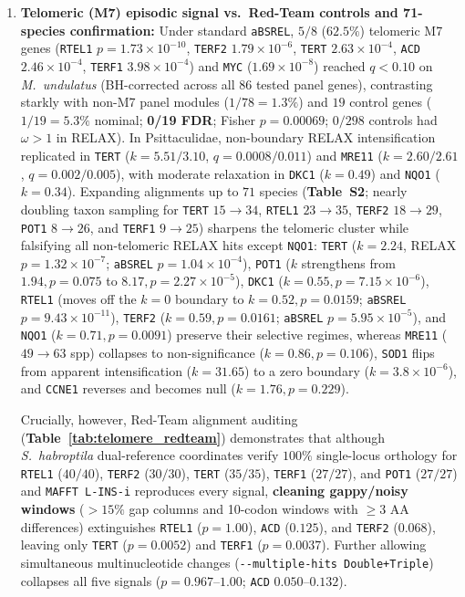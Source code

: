 \documentclass[10pt,a4paper,twocolumn]{article}
\begin{document}
\begin{enumerate}
    \item \textbf{Telomeric (M7) episodic signal vs.\ Red-Team controls and 71-species confirmation:} Under standard \texttt{aBSREL}, $5/8$ ($62.5\%$) telomeric M7 genes (\texttt{RTEL1} $p = 1.73\times 10^{-10}$, \texttt{TERF2} $1.79\times 10^{-6}$, \texttt{TERT} $2.63\times 10^{-4}$, \texttt{ACD} $2.46\times 10^{-4}$, \texttt{TERF1} $3.98\times 10^{-4}$) and \texttt{MYC} ($1.69\times 10^{-8}$) reached $q < 0.10$ on \textit{M.\ undulatus} (BH-corrected across all $86$ tested panel genes), contrasting starkly with non-M7 panel modules ($1/78 = 1.3\%$) and $19$ control genes ($1/19 = 5.3\%$ nominal; \textbf{0/19 FDR}; Fisher $p = 0.00069$; $0/298$ controls had $\omega > 1$ in RELAX). In Psittaculidae, non-boundary RELAX intensification replicated in \texttt{TERT} ($k = 5.51/3.10$, $q = 0.0008/0.011$) and \texttt{MRE11} ($k = 2.60/2.61$, $q = 0.002/0.005$), with moderate relaxation in \texttt{DKC1} ($k = 0.49$) and \texttt{NQO1} ($k = 0.34$). Expanding alignments up to $71$ species (\textbf{Table~S2}; nearly doubling taxon sampling for \texttt{TERT} $15\to 34$, \texttt{RTEL1} $23\to 35$, \texttt{TERF2} $18\to 29$, \texttt{POT1} $8\to 26$, and \texttt{TERF1} $9\to 25$) sharpens the telomeric cluster while falsifying all non-telomeric RELAX hits except \texttt{NQO1}: \texttt{TERT} ($k = 2.24$, RELAX $p = 1.32\times 10^{-7}$; \texttt{aBSREL} $p = 1.04\times 10^{-4}$), \texttt{POT1} ($k$ strengthens from $1.94, p = 0.075$ to $8.17, p = 2.27\times 10^{-5}$), \texttt{DKC1} ($k = 0.55, p = 7.15\times 10^{-6}$), \texttt{RTEL1} (moves off the $k=0$ boundary to $k = 0.52, p = 0.0159$; \texttt{aBSREL} $p = 9.43\times 10^{-11}$), \texttt{TERF2} ($k = 0.59, p = 0.0161$; \texttt{aBSREL} $p = 5.95\times 10^{-5}$), and \texttt{NQO1} ($k = 0.71, p = 0.0091$) preserve their selective regimes, whereas \texttt{MRE11} ($49\to 63$ spp) collapses to non-significance ($k = 0.86, p = 0.106$), \texttt{SOD1} flips from apparent intensification ($k = 31.65$) to a zero boundary ($k = 3.8\times 10^{-6}$), and \texttt{CCNE1} reverses and becomes null ($k = 1.76, p = 0.229$).

    Crucially, however, Red-Team alignment auditing (\textbf{Table~\ref{tab:telomere_redteam}}) demonstrates that although \textit{S.\ habroptila} dual-reference coordinates verify $100\%$ single-locus orthology for \texttt{RTEL1} ($40/40$), \texttt{TERF2} ($30/30$), \texttt{TERT} ($35/35$), \texttt{TERF1} ($27/27$), and \texttt{POT1} ($27/27$) and \texttt{MAFFT L-INS-i} reproduces every signal, \textbf{cleaning gappy/noisy windows} ($>15\%$ gap columns and 10-codon windows with $\ge 3$ AA differences) extinguishes \texttt{RTEL1} ($p = 1.00$), \texttt{ACD} ($0.125$), and \texttt{TERF2} ($0.068$), leaving only \texttt{TERT} ($p = 0.0052$) and \texttt{TERF1} ($p = 0.0037$). Further allowing simultaneous multinucleotide changes (\texttt{-{}-multiple-hits Double+Triple}) collapses all five signals ($p = 0.967$--$1.00$; \texttt{ACD} $0.050$--$0.132$).
\end{enumerate}
\end{document}
